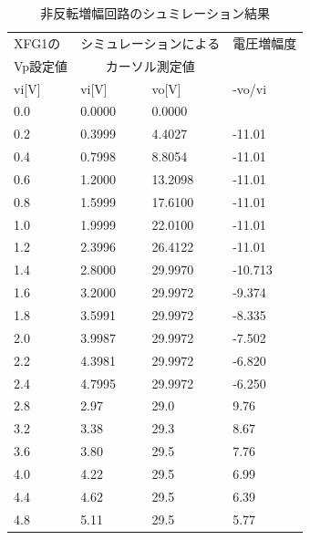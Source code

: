 \documentclass[a4j,10pt,dvipdfmx]{jarticle}
\begin{document}
\begin{table}[H]
  \begin{center}
  \begin{tabular}{|l|l|l|l|}
  \hline
      XFG1の & \multicolumn{2}{|c|}{シミュレーションによる}  & 電圧増幅度 \\
      Vp設定値 & \multicolumn{2}{|c|}{カーソル測定値}  & \\ \hline
      vi[V] & vi[V] & vo[V] & -vo/vi \\ \hline
      0.0  & 0.0000 & 0.0000 &  \\ \hline
      0.2  & 0.3999 & 4.4027 & -11.01 \\ \hline
      0.4  & 0.7998 & 8.8054 & -11.01 \\ \hline
      0.6  & 1.2000 & 13.2098 & -11.01 \\ \hline
      0.8  & 1.5999 & 17.6100 & -11.01 \\ \hline
      1.0  & 1.9999 & 22.0100 & -11.01 \\ \hline
      1.2  & 2.3996 & 26.4122 & -11.01 \\ \hline
      1.4  & 2.8000 & 29.9970 & -10.713 \\ \hline
      1.6  & 3.2000 & 29.9972 & -9.374 \\ \hline
      1.8  & 3.5991 & 29.9972 & -8.335 \\ \hline
      2.0  & 3.9987 & 29.9972 & -7.502 \\ \hline
      2.2  & 4.3981 & 29.9972 & -6.820 \\ \hline
      2.4  & 4.7995 & 29.9972 & -6.250 \\ \hline
      2.8  & 2.97  & 29.0  & 9.76 \\ \hline
      3.2  & 3.38  & 29.3  & 8.67 \\ \hline
      3.6  & 3.80  & 29.5  & 7.76 \\ \hline
      4.0  & 4.22  & 29.5  & 6.99 \\ \hline
      4.4  & 4.62  & 29.5  & 6.39 \\ \hline
      4.8  & 5.11  & 29.5  & 5.77 \\ \hline
  \end{tabular}
  \caption{非反転増幅回路のシュミレーション結果}
\end{center}
\end{table}
\end{document}

